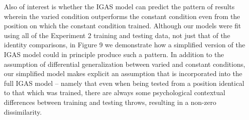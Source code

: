 \documentclass[
  man,floatsintext]{apa7}
\begin{document}
Also of interest is whether the IGAS model can predict the pattern of results wherein the varied condition outperforms the constant condition even from the position on which the constant condition trained. Although our models were fit using all of the Experiment 2 training and testing data, not just that of the identity comparisons, in Figure 9 we demonstrate how a simplified version of the IGAS model could in principle produce such a pattern. In addition to the assumption of differential generalization between varied and constant conditions, our simplified model makes explicit an assumption that is incorporated into the full IGAS model -- namely that even when being tested from a position identical to that which was trained, there are always some psychological contextual differences between training and testing throws, resulting in a non-zero dissimilarity.
\end{document}

